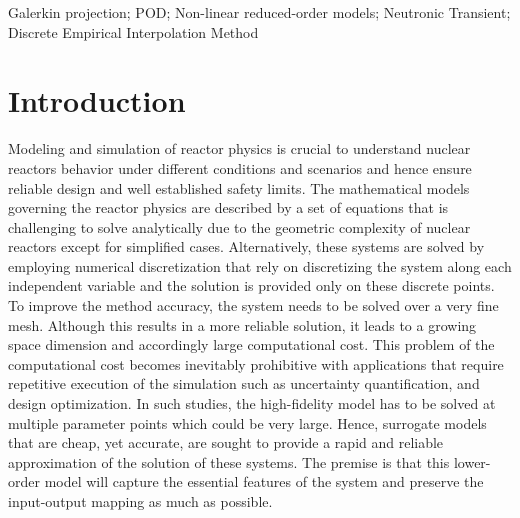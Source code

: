 \documentclass[]{interact}
\theoremstyle{plain}%
\theoremstyle{definition}
\theoremstyle{remark}
\begin{document}
\begin{keywords}
Galerkin projection; POD; Non-linear reduced-order models; Neutronic Transient; Discrete Empirical Interpolation Method
\end{keywords}


\section{Introduction}

Modeling and simulation of reactor physics is crucial to understand nuclear reactors behavior under different conditions and scenarios and hence ensure reliable design and well established safety limits.
The mathematical models governing the reactor physics are described by a set of equations that is challenging to solve analytically due to the geometric complexity of nuclear reactors except for simplified cases.
Alternatively, these systems are solved by employing numerical discretization that rely on discretizing the system along each independent variable and the solution is provided only on these discrete points.
To improve the method accuracy, the system needs to be solved over a very fine mesh.
Although this results in a more reliable solution, it leads to a growing space dimension and accordingly large computational cost.
This problem of the computational cost becomes inevitably prohibitive with applications that require repetitive execution of the simulation such as uncertainty quantification, and design optimization.
In such studies, the high-fidelity model has to be solved at multiple parameter points which could be very large.
Hence, surrogate models that are cheap, yet accurate, are sought to provide a rapid and reliable approximation of the solution of these systems.
The premise is that this lower-order model will capture the essential features of the system  and preserve the input-output mapping as much as possible.
\end{document}
